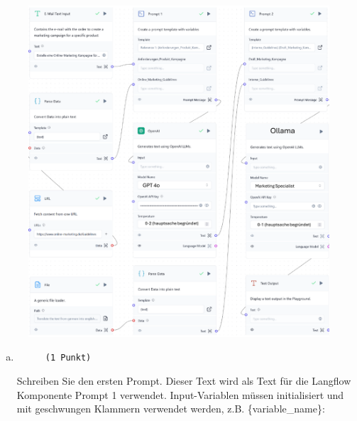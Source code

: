 \documentclass[12pt, ngerman]{AssignmentClass}
\begin{document}
	\begin{solution}
		\noindent
                \begin{figure}
                    \centering
                    \includegraphics[width=\linewidth]{media/Aufgabe 6/Aufgabe6-Loesung.pdf}
                    \label{fig:Aufgabe6-Loesung}
                \end{figure}
	\end{solution}


    \begin{enumerate}[b)]
		\item 
			\begin{minipage}[t]{\linewidth}
				\vspace{-0.61em}
				\begin{figure} 
					\raggedleft
					\texttt{(1 Punkt)}
				\end{figure}
                Schreiben Sie den ersten Prompt. Dieser Text wird als Text für die Langflow Komponente Prompt 1 verwendet. Input-Variablen müssen initialisiert und mit geschwungen Klammern verwendet werden, z.B. \{variable\_name\}:
			\end{minipage}
	\end{enumerate}
\end{document}
